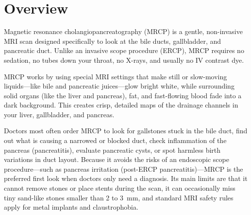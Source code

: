 \label{ch:infographic-mrcp}

\section{Overview}

Magnetic resonance cholangiopancreatography (MRCP) is a gentle, non-invasive MRI scan designed specifically to look at the bile ducts, gallbladder, and pancreatic duct. Unlike an invasive scope procedure (ERCP), MRCP requires no sedation, no tubes down your throat, no X-rays, and usually no IV contrast dye.

MRCP works by using special MRI settings that make still or slow-moving liquids---like bile and pancreatic juices---glow bright white, while surrounding solid organs (like the liver and pancreas), fat, and fast-flowing blood fade into a dark background. This creates crisp, detailed maps of the drainage channels in your liver, gallbladder, and pancreas.

Doctors most often order MRCP to look for gallstones stuck in the bile duct, find out what is causing a narrowed or blocked duct, check inflammation of the pancreas (pancreatitis), evaluate pancreatic cysts, or spot harmless birth variations in duct layout. Because it avoids the risks of an endoscopic scope procedure---such as pancreas irritation (post-ERCP pancreatitis)---MRCP is the preferred first look when doctors only need a diagnosis. Its main limits are that it cannot remove stones or place stents during the scan, it can occasionally miss tiny sand-like stones smaller than 2 to 3~mm, and standard MRI safety rules apply for metal implants and claustrophobia.

